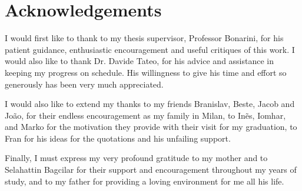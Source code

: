 \chapter*{Acknowledgements}




I would first like to thank to my thesis supervisor, Professor Bonarini, for his patient guidance, enthusiastic encouragement and useful critiques of this work. I would also like to thank Dr. Davide Tateo, for his advice and assistance in keeping my progress on schedule. His willingness to give his time and effort so generously has been very much appreciated. 

I would also like to extend my thanks to my friends Branislav, Beste, Jacob and Jo\~ao, for their endless encouragement as my family in Milan, to In\~es, Iomhar, and Marko for the motivation they provide with their visit for my graduation, to Fran for his ideas for the quotations and his unfailing support.  

Finally, I must express my very profound gratitude to my mother and to Selahattin Bagcilar for their support and encouragement throughout my years of study, and to my father for providing a loving environment for me all his life. 


